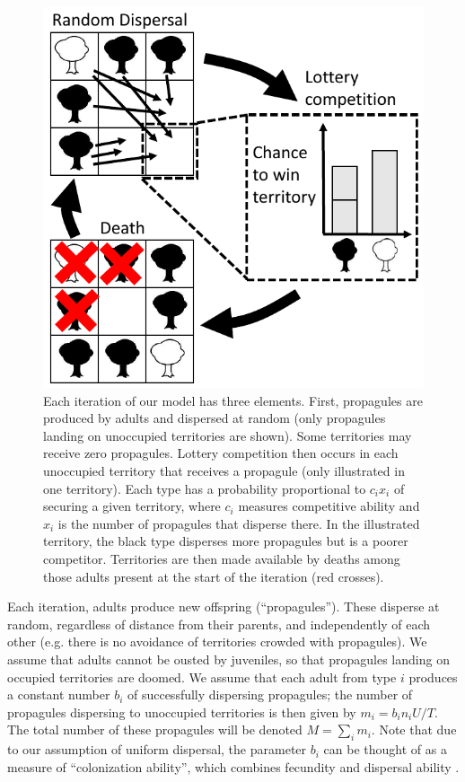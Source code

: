 \documentclass[12pt]{article}
\begin{document}
\begin{figure}
\centering
\includegraphics[scale=0.8]{lottery.pdf}
\caption{\label{fig:lottery} Each iteration of our model has three elements. First, propagules are produced by adults and dispersed at random (only propagules landing on unoccupied territories are shown). Some territories may receive zero propagules. Lottery competition then occurs in each unoccupied territory that receives a propagule (only illustrated in one territory). Each type has a probability proportional to $c_i x_i$ of securing a given territory, where $c_i$ measures competitive ability and $x_i$ is the number of propagules that disperse there. In the illustrated territory, the black type disperses more propagules but is a poorer competitor. Territories are then made available by deaths among those adults present at the start of the iteration (red crosses).}
\end{figure}

Each iteration, adults produce new offspring (``propagules''). These disperse at random, regardless of distance from their parents, and independently of each other (e.g. there is no avoidance of territories crowded with propagules). We assume that adults cannot be ousted by juveniles, so that propagules landing on occupied territories are doomed. We assume that each adult from type $i$ produces a constant number $b_i$ of successfully dispersing propagules; the number of propagules dispersing to unoccupied territories is then given by $m_i=b_in_iU/T$. The total number of these propagules will be denoted $M=\sum_i m_i$. Note that due to our assumption of uniform dispersal, the parameter $b_i$ can be thought of as a measure of ``colonization ability'', which combines fecundity and dispersal ability \citep{levins_71,tilman_94,bolker_99}. 
\end{document}

